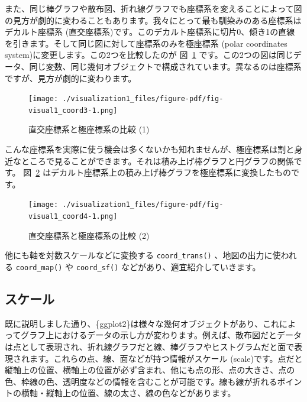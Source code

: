 \documentclass[
  a4paper,
  pandoc,
  ja=standard,
  jafont=haranoaji]{bxjsbook}
\begin{document}
また、同じ棒グラフや散布図、折れ線グラフでも座標系を変えることによって図の見方が劇的に変わることもあります。我々にとって最も馴染みのある座標系はデカルト座標系
(直交座標系)です。このデカルト座標系に切片0、傾き1の直線を引きます。そして同じ図に対して座標系のみを極座標系
(polar coordinates system)に変更します。この2つを比較したのが
図~\ref{fig-visual1_coord3}
です。この2つの図は同じデータ、同じ変数、同じ幾何オブジェクトで構成されています。異なるのは座標系ですが、見方が劇的に変わります。

\begin{figure}

{\centering \texttt{[image: ./visualization1\_files/figure-pdf/fig-visual1\_coord3-1.png]}

}

\caption{\label{fig-visual1_coord3}直交座標系と極座標系の比較 (1)}

\end{figure}

こんな座標系を実際に使う機会は多くないかも知れませんが、極座標系は割と身近なところで見ることができます。それは積み上げ棒グラフと円グラフの関係です。
図~\ref{fig-visual1_coord4}
はデカルト座標系上の積み上げ棒グラフを極座標系に変換したものです。

\begin{figure}

{\centering \texttt{[image: ./visualization1\_files/figure-pdf/fig-visual1\_coord4-1.png]}

}

\caption{\label{fig-visual1_coord4}直交座標系と極座標系の比較 (2)}

\end{figure}

他にも軸を対数スケールなどに変換する \texttt{coord\_trans()}
、地図の出力に使われる \texttt{coord\_map()} や \texttt{coord\_sf()}
などがあり、適宜紹介していきます。

\hypertarget{ux30b9ux30b1ux30fcux30eb}{%
\subsection{スケール}\label{ux30b9ux30b1ux30fcux30eb}}

既に説明しました通り、\{ggplot2\}は様々な幾何オブジェクトがあり、これによってグラフ上におけるデータの示し方が変わります。例えば、散布図だとデータは点として表現され、折れ線グラフだと線、棒グラフやヒストグラムだと面で表現されます。これらの点、線、面などが持つ情報がスケール
(scale)です。点だと縦軸上の位置、横軸上の位置が必ず含まれ、他にも点の形、点の大きさ、点の色、枠線の色、透明度などの情報を含むことが可能です。線も線が折れるポイントの横軸・縦軸上の位置、線の太さ、線の色などがあります。
\end{document}
